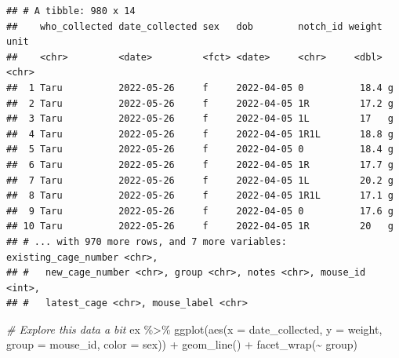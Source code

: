 \documentclass[
]{book}
\newenvironment{Shaded}{\begin{snugshade}}{\end{snugshade}}
\newcommand{\AttributeTok}[1]{\textcolor[rgb]{0.77,0.63,0.00}{#1}}
\newcommand{\CommentTok}[1]{\textcolor[rgb]{0.56,0.35,0.01}{\textit{#1}}}
\newcommand{\FunctionTok}[1]{\textcolor[rgb]{0.00,0.00,0.00}{#1}}
\newcommand{\NormalTok}[1]{#1}
\newcommand{\OtherTok}[1]{\textcolor[rgb]{0.56,0.35,0.01}{#1}}
\newcommand{\SpecialCharTok}[1]{\textcolor[rgb]{0.00,0.00,0.00}{#1}}
\newcommand{\StringTok}[1]{\textcolor[rgb]{0.31,0.60,0.02}{#1}}
\begin{document}
\begin{Shaded}
\end{Shaded}

\begin{verbatim}
## # A tibble: 980 x 14
##    who_collected date_collected sex   dob        notch_id weight unit 
##    <chr>         <date>         <fct> <date>     <chr>     <dbl> <chr>
##  1 Taru          2022-05-26     f     2022-04-05 0          18.4 g    
##  2 Taru          2022-05-26     f     2022-04-05 1R         17.2 g    
##  3 Taru          2022-05-26     f     2022-04-05 1L         17   g    
##  4 Taru          2022-05-26     f     2022-04-05 1R1L       18.8 g    
##  5 Taru          2022-05-26     f     2022-04-05 0          18.4 g    
##  6 Taru          2022-05-26     f     2022-04-05 1R         17.7 g    
##  7 Taru          2022-05-26     f     2022-04-05 1L         20.2 g    
##  8 Taru          2022-05-26     f     2022-04-05 1R1L       17.1 g    
##  9 Taru          2022-05-26     f     2022-04-05 0          17.6 g    
## 10 Taru          2022-05-26     f     2022-04-05 1R         20   g    
## # ... with 970 more rows, and 7 more variables: existing_cage_number <chr>,
## #   new_cage_number <chr>, group <chr>, notes <chr>, mouse_id <int>,
## #   latest_cage <chr>, mouse_label <chr>
\end{verbatim}

\begin{Shaded}
\begin{Highlighting}[]
\CommentTok{\# Explore this data a bit}
\NormalTok{ex }\SpecialCharTok{\%\textgreater{}\%} 
  \FunctionTok{ggplot}\NormalTok{(}\FunctionTok{aes}\NormalTok{(}\AttributeTok{x =}\NormalTok{ date\_collected, }\AttributeTok{y =}\NormalTok{ weight, }
             \AttributeTok{group =}\NormalTok{ mouse\_id, }\AttributeTok{color =}\NormalTok{ sex)) }\SpecialCharTok{+} 
  \FunctionTok{geom\_line}\NormalTok{() }\SpecialCharTok{+} 
  \FunctionTok{facet\_wrap}\NormalTok{(}\SpecialCharTok{\textasciitilde{}}\NormalTok{ group)}
\end{Highlighting}
\end{Shaded}
\end{document}
